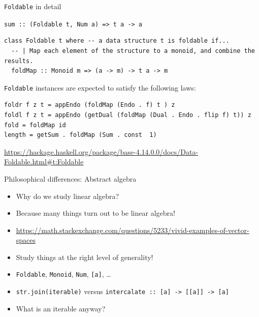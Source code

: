 \documentclass[8pt]{beamer}
\newcommand{\raw}[1]{\texttt{#1}}
\newcommand{\hs}[1]{\texttt{#1}}
\begin{document}
\begin{frame}[fragile]{\texttt{Foldable} in detail}

\hs{sum :: (Foldable t, Num a) => t a -> a}
\pause


\begin{verbatim}
class Foldable t where -- a data structure t is foldable if...
  -- | Map each element of the structure to a monoid, and combine the results.
  foldMap :: Monoid m => (a -> m) -> t a -> m
\end{verbatim}

\verb|Foldable| instances are expected to satisfy the following laws:

\begin{verbatim}
foldr f z t = appEndo (foldMap (Endo . f) t ) z
foldl f z t = appEndo (getDual (foldMap (Dual . Endo . flip f) t)) z
fold = foldMap id
length = getSum . foldMap (Sum . const  1)
\end{verbatim}
{\tiny \url{https://hackage.haskell.org/package/base-4.14.0.0/docs/Data-Foldable.html#t:Foldable}}
\end{frame}

\begin{frame}[fragile]{Philosophical differences: Abstract algebra}
    \begin{itemize}
        \item Why do we study linear algebra? \pause
        \item Because many things turn out to be linear algebra! \pause
        \item \url{https://math.stackexchange.com/questions/5233/vivid-examples-of-vector-spaces} \pause
        \item Study things at the right level of generality! \pause
        \item \hs{Foldable}, \hs{Monoid}, \hs{Num}, \hs{[a]}, \dots \pause
        \item \raw{str.join(iterable)} versus \hs{intercalate :: [a] -> [[a]] -> [a]} \pause
        \item What is an iterable anyway? \pause
    \end{itemize}
\end{frame}
\end{document}
